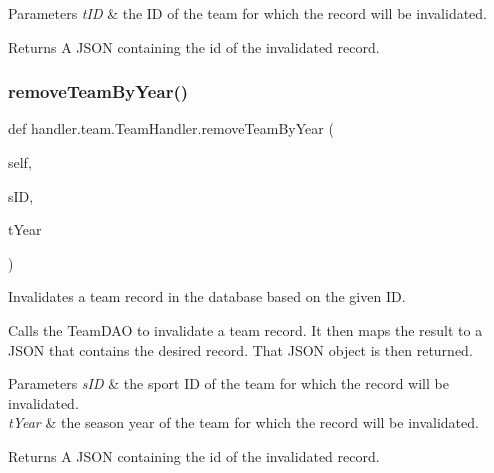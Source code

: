 \begin{DoxyParams}{Parameters}
{\em t\+ID} & the ID of the team for which the record will be invalidated.\\
\hline
\end{DoxyParams}
\begin{DoxyReturn}{Returns}
A J\+S\+ON containing the id of the invalidated record. 
\end{DoxyReturn}
\mbox{\label{classhandler_1_1team_1_1_team_handler_a9edec7a490cd154b7d4033badb1fdacf}} 
\subsubsection{\texorpdfstring{remove\+Team\+By\+Year()}{removeTeamByYear()}}
{\footnotesize\ttfamily def handler.\+team.\+Team\+Handler.\+remove\+Team\+By\+Year (\begin{DoxyParamCaption}\item[{}]{self,  }\item[{}]{s\+ID,  }\item[{}]{t\+Year }\end{DoxyParamCaption})}



Invalidates a team record in the database based on the given ID. 

Calls the Team\+D\+AO to invalidate a team record. It then maps the result to a J\+S\+ON that contains the desired record. That J\+S\+ON object is then returned.


\begin{DoxyParams}{Parameters}
{\em s\+ID} & the sport ID of the team for which the record will be invalidated. \\
\hline
{\em t\+Year} & the season year of the team for which the record will be invalidated.\\
\hline
\end{DoxyParams}
\begin{DoxyReturn}{Returns}
A J\+S\+ON containing the id of the invalidated record. 
\end{DoxyReturn}
\mbox{\label{classhandler_1_1team_1_1_team_handler_aac0d812b5de7f390f36d12590429df95}} 
